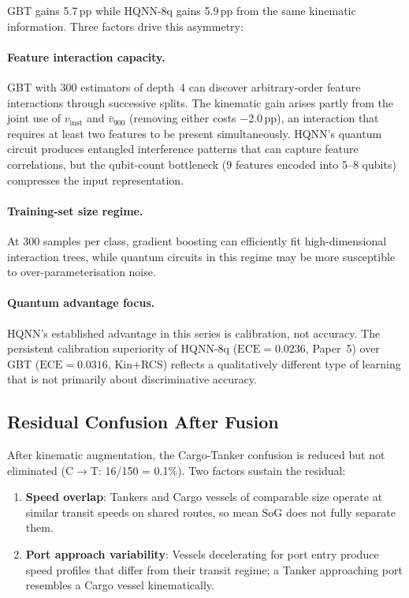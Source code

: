 \documentclass[journal]{IEEEtran}
\begin{document}
GBT gains 5.7\,pp while HQNN-8q gains 5.9\,pp from the same
kinematic information. Three factors drive this asymmetry:

\paragraph{Feature interaction capacity.}
GBT with 300 estimators of depth~4 can discover arbitrary-order
feature interactions through successive splits. The kinematic gain
arises partly from the joint use of $v_{\text{inst}}$ and $\bar{v}_{900}$
(removing either costs $-$2.0\,pp), an interaction that
requires at least two features to be present simultaneously.
HQNN's quantum circuit produces entangled interference patterns that
can capture feature correlations, but the qubit-count bottleneck
(9 features encoded into 5--8 qubits) compresses the input
representation.

\paragraph{Training-set size regime.}
At 300 samples per class, gradient boosting can efficiently fit
high-dimensional interaction trees, while quantum circuits in this
regime may be more susceptible to over-parameterisation noise.

\paragraph{Quantum advantage focus.}
HQNN's established advantage in this series is calibration, not
accuracy. The persistent calibration superiority of HQNN-8q
($\text{ECE} = 0.0236$, Paper~5) over GBT ($\text{ECE} = 0.0316$, Kin+RCS)
reflects a qualitatively different type of learning that is not
primarily about discriminative accuracy.

\subsection{Residual Confusion After Fusion}

After kinematic augmentation, the Cargo-Tanker confusion is reduced
but not eliminated (C$\to$T: 16/150 = 0.1\%). Two factors sustain the residual:
\begin{enumerate}
\item \textbf{Speed overlap}: Tankers and Cargo vessels of comparable
  size operate at similar transit speeds on shared routes, so mean SoG
  does not fully separate them.
\item \textbf{Port approach variability}: Vessels decelerating for port
  entry produce speed profiles that differ from their transit regime;
  a Tanker approaching port resembles a Cargo vessel kinematically.
\end{enumerate}
\end{document}
